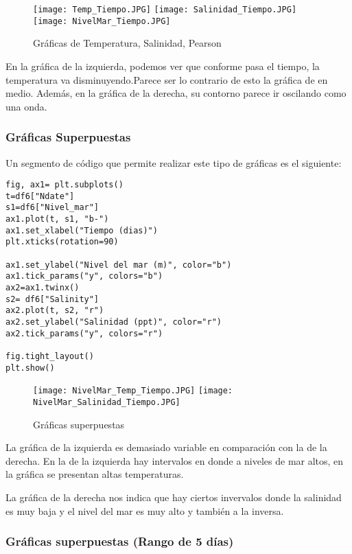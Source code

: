 \documentclass[a4paper]{article}
\begin{document}
\begin{figure}[h!]
\centering 
\texttt{[image: Temp\_Tiempo.JPG]}
\label{fig:00Z}
\texttt{[image: Salinidad\_Tiempo.JPG]}
\label{fig:12Z}  
\texttt{[image: NivelMar\_Tiempo.JPG]}
\caption{Gráficas de Temperatura, Salinidad, Pearson}
\end{figure}



En la gráfica de la izquierda, podemos ver que conforme pasa el tiempo, la temperatura va disminuyendo.Parece ser lo contrario de esto la gráfica de en medio. Además, en la gráfica de la derecha, su contorno parece ir oscilando como una onda.




\newpage

\subsubsection{Gráficas Superpuestas}

Un segmento de código que permite realizar este tipo de gráficas es el siguiente:
\begin{verbatim}
fig, ax1= plt.subplots()
t=df6["Ndate"]
s1=df6["Nivel_mar"]
ax1.plot(t, s1, "b-")
ax1.set_xlabel("Tiempo (dias)")
plt.xticks(rotation=90)

ax1.set_ylabel("Nivel del mar (m)", color="b")
ax1.tick_params("y", colors="b")
ax2=ax1.twinx()
s2= df6["Salinity"]
ax2.plot(t, s2, "r")
ax2.set_ylabel("Salinidad (ppt)", color="r")
ax2.tick_params("y", colors="r")

fig.tight_layout()
plt.show()
\end{verbatim}


\begin{figure}[h!]
\centering 
\texttt{[image: NivelMar\_Temp\_Tiempo.JPG]}
\label{fig:00Z}
\texttt{[image: NivelMar\_Salinidad\_Tiempo.JPG]}
\label{fig:12Z}  
\caption{Gráficas superpuestas}
\end{figure}

La gráfica de la izquierda es demasiado variable en comparación con la de la derecha. En la de la izquierda hay intervalos en donde a niveles de mar altos, en la gráfica se presentan altas temperaturas.

La gráfica de la derecha nos indica que hay ciertos invervalos donde la salinidad es muy baja y el nivel del mar es muy alto y también a la inversa. 


\subsubsection{Gráficas superpuestas (Rango de 5 días)}
\end{document}
